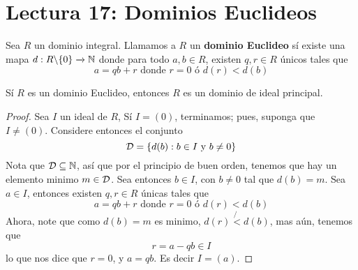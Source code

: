 \section*{Lectura 17: Dominios Euclideos}

\begin{definition}
    Sea $R$ un dominio integral. Llamamos a  $R$ un  \textbf{dominio Euclideo}
    s\'i existe una mapa $d:R\backslash\{0\} \xrightarrow{} \mathbb{N}$ donde para todo
    $a,b \in R$, existen $q,r \in R$ \'unicos tales que
    \begin{equation*}
        a=qb+r \text{ donde } r=0 \text{ \'o } d(r)<d(b)
    \end{equation*}
\end{definition}

\begin{theorem}\label{17.71}
    S\'i $R$ es un dominio Euclideo, entonces $R$ es un dominio de ideal
    principal.
\end{theorem}
\begin{proof}
    Sea $I$ un ideal de $R$, S\'i $I=(0)$, terminamos; pues, suponga que $I \neq
    (0)$. Considere entonces el conjunto
    \begin{equation*}
        \mathcal{D}=\{d(b) : b \in I \text{ y } b \neq 0\}
    \end{equation*}
    Nota que $\mathcal{D} \subseteq \mathbb{N}$, as\'i que por el principio de buen orden,
    tenemos que hay un elemento minimo $m \in \mathcal{D}$. Sea entonces $b \in I$, con
     $b \neq 0$ tal que  $d(b)=m$. Sea $a \in I$, entonces existen $q,r \in R$
     \'unicas tales que
     \begin{equation*}
         a=qb+r \text{ donde } r=0 \text{ \'o } d(r)<d(b)
     \end{equation*}
     Ahora, note que como $d(b)=m$ es minimo, $d(r) \not{<} d(b)$, mas a\'un,
     tenemos que
     \begin{equation*}
         r=a-qb \in I
     \end{equation*}
     lo que nos dice que $r=0$, y  $a=qb$. Es decir  $I=(a)$.
\end{proof}

